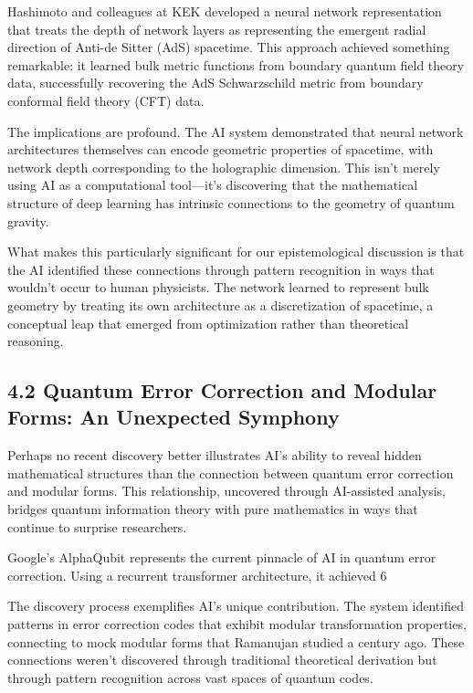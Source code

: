 \documentclass{article}
\begin{document}
Hashimoto and colleagues at KEK developed a neural network representation that treats the depth of network layers as representing the emergent radial direction of Anti-de Sitter (AdS) spacetime. This approach achieved something remarkable: it learned bulk metric functions from boundary quantum field theory data, successfully recovering the AdS Schwarzschild metric from boundary conformal field theory (CFT) data.


The implications are profound. The AI system demonstrated that neural network architectures themselves can encode geometric properties of spacetime, with network depth corresponding to the holographic dimension. This isn't merely using AI as a computational tool—it's discovering that the mathematical structure of deep learning has intrinsic connections to the geometry of quantum gravity.


What makes this particularly significant for our epistemological discussion is that the AI identified these connections through pattern recognition in ways that wouldn't occur to human physicists. The network learned to represent bulk geometry by treating its own architecture as a discretization of spacetime, a conceptual leap that emerged from optimization rather than theoretical reasoning.


\subsection{4.2 Quantum Error Correction and Modular Forms: An Unexpected Symphony}

Perhaps no recent discovery better illustrates AI's ability to reveal hidden mathematical structures than the connection between quantum error correction and modular forms. This relationship, uncovered through AI-assisted analysis, bridges quantum information theory with pure mathematics in ways that continue to surprise researchers.


Google's AlphaQubit represents the current pinnacle of AI in quantum error correction. Using a recurrent transformer architecture, it achieved 6%


The discovery process exemplifies AI's unique contribution. The system identified patterns in error correction codes that exhibit modular transformation properties, connecting to mock modular forms that Ramanujan studied a century ago. These connections weren't discovered through traditional theoretical derivation but through pattern recognition across vast spaces of quantum codes.
\end{document}
